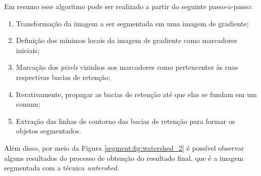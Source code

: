Em resumo esse algoritmo pode ser realizado a partir do seguinte passo-a-passo:

\begin{enumerate}
    \item Transformação da imagem a ser segmentada em uma imagem de gradiente;
    \item Definição dos mínimos locais da imagem de gradiente como marcadores iniciais;
    \item Marcação dos \textit{pixels} vizinhos aos marcadores como pertencentes às suas respectivas bacias de retenção;
    \item Iterativamente, propagar as bacias de retenção até que elas se fundam em um  comum;
    \item Extração das linhas de contorno das bacias de retenção para formar os objetos segmentados.
\end{enumerate}

Além disso, por meio da Figura \ref{segment:fig:watershed_2} é possível observar alguns resultados do processo de obtenção do resultado final, que é a imagem segmentada com a técnica \textit{watershed}.

